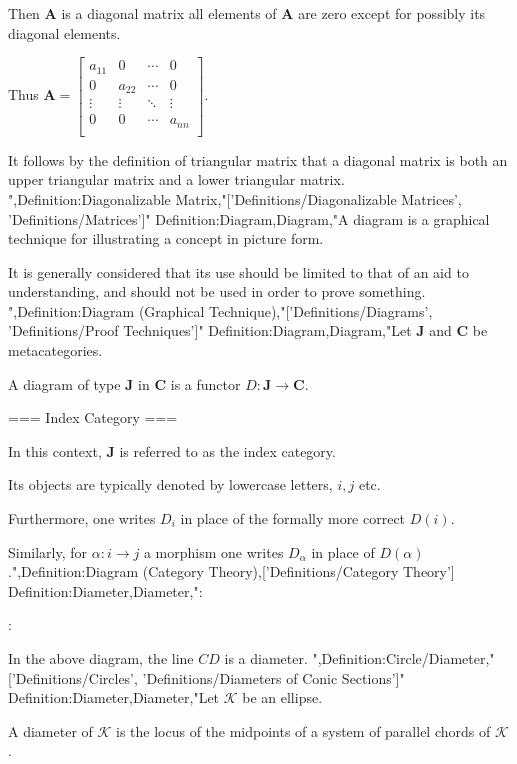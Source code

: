 Then $\mathbf A$ is a diagonal matrix  all elements of $\mathbf A$ are zero except for possibly its diagonal elements.


Thus $\mathbf A = \begin{bmatrix}
a_{11} & 0 & \cdots & 0 \\
0 & a_{22} & \cdots & 0 \\
\vdots & \vdots & \ddots & \vdots \\
0 & 0 & \cdots & a_{nn} \\
\end{bmatrix}$.


It follows by the definition of triangular matrix that a diagonal matrix is both an upper triangular matrix and a lower triangular matrix.
",Definition:Diagonalizable Matrix,"['Definitions/Diagonalizable Matrices', 'Definitions/Matrices']"
Definition:Diagram,Diagram,"A diagram is a graphical technique for illustrating a concept in picture form.

It is generally considered that its use should be limited to that of an aid to understanding, and should not be used in order to prove something.
",Definition:Diagram (Graphical Technique),"['Definitions/Diagrams', 'Definitions/Proof Techniques']"
Definition:Diagram,Diagram,"Let $\mathbf J$ and $\mathbf C$ be metacategories.


A diagram of type $\mathbf J$ in $\mathbf C$ is a functor $D: \mathbf J \to \mathbf C$.


=== Index Category ===

In this context, $\mathbf J$ is referred to as the index category.

Its objects are typically denoted by lowercase letters, $i, j$ etc.


Furthermore, one writes $D_i$ in place of the formally more correct $D \left({i}\right)$.

Similarly, for $\alpha: i \to j$ a morphism one writes $D_\alpha$ in place of $D \left({\alpha}\right)$.",Definition:Diagram (Category Theory),['Definitions/Category Theory']
Definition:Diameter,Diameter,":


:


In the above diagram, the line $CD$ is a diameter.
",Definition:Circle/Diameter,"['Definitions/Circles', 'Definitions/Diameters of Conic Sections']"
Definition:Diameter,Diameter,"Let $\mathcal K$ be an ellipse.

A diameter of $\mathcal K$ is the locus of the midpoints of a system of parallel chords of $\mathcal K$.


